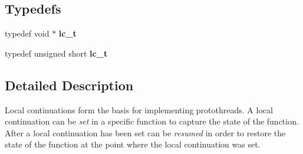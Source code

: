 \subsection*{Typedefs}
\begin{DoxyCompactItemize}
\item 
\hypertarget{group__lc_ga2bdc4b7b4038454a79f1b2a94a6d2a98}{
typedef void $\ast$ {\bfseries lc\_\-t}}
\label{group__lc_ga2bdc4b7b4038454a79f1b2a94a6d2a98}

\item 
\hypertarget{group__lc_ga3983e0c026396d5c4506779d770007ba}{
typedef unsigned short {\bfseries lc\_\-t}}
\label{group__lc_ga3983e0c026396d5c4506779d770007ba}

\end{DoxyCompactItemize}


\subsection{Detailed Description}
Local continuations form the basis for implementing protothreads. A local continuation can be {\itshape set\/} in a specific function to capture the state of the function. After a local continuation has been set can be {\itshape resumed\/} in order to restore the state of the function at the point where the local continuation was set. 

